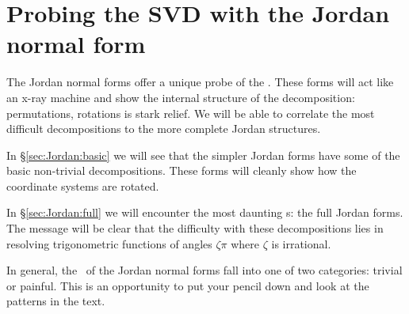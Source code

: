 \chapter[Probing the SVD]{Probing the SVD with the Jordan normal form}
The Jordan normal forms offer a unique probe of the \svdp. These forms will act like an x-ray machine and show the internal structure  of the decomposition: permutations, rotations is stark relief. We will be able to correlate the most difficult decompositions to the more complete Jordan structures.

In \S \eqref{sec:Jordan:basic} we will see that the simpler Jordan forms have some of the basic non-trivial decompositions. These forms will cleanly show how the coordinate systems are rotated.

In \S \eqref{sec:Jordan:full} we will encounter the most daunting \svdl s: the full Jordan forms. The message will be clear that the difficulty with these decompositions lies in resolving trigonometric functions of angles $\zeta \pi$ where $\zeta$ is irrational.

In general, the \svdl \ of the Jordan normal forms fall into one of two categories: trivial or painful. This is an opportunity to put your pencil down and look at the patterns in the text.





\endinput
